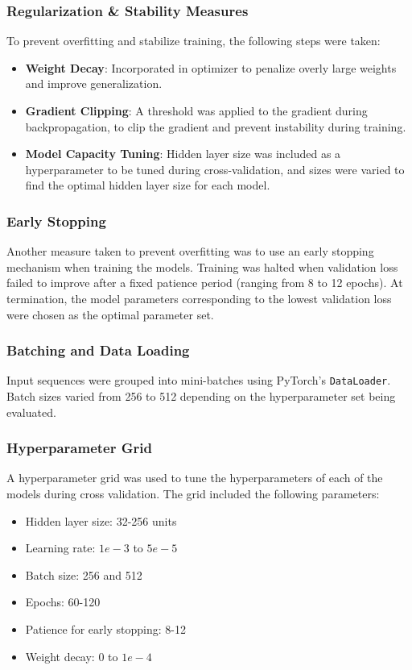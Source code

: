 \documentclass[conference]{IEEEtran}
\begin{document}
\subsubsection{\textbf{Regularization \& Stability Measures}}
To prevent overfitting and stabilize training, the following steps were taken:
\begin{itemize}
    \item \textbf{Weight Decay}: Incorporated in optimizer to penalize overly large weights and improve generalization.
    \item \textbf{Gradient Clipping}: A threshold was applied to the gradient during backpropagation, to clip the gradient and prevent instability during training.
    \item \textbf{Model Capacity Tuning}: Hidden layer size was included as a hyperparameter to be tuned during cross-validation, and sizes were varied to find the optimal hidden layer size for each model.
\end{itemize}

\subsubsection{\textbf{Early Stopping}}
Another measure taken to prevent overfitting was to use an early stopping mechanism when training the models. Training was halted when validation loss failed to improve after a fixed patience period (ranging from 8 to 12 epochs). At termination, the model parameters corresponding to the lowest validation loss were chosen as the optimal parameter set.

\subsubsection{\textbf{Batching and Data Loading}}
Input sequences were grouped into mini-batches using PyTorch's \texttt{DataLoader}. Batch sizes varied from 256 to 512 depending on the hyperparameter set being evaluated.

\subsubsection{\textbf{Hyperparameter Grid}}
A hyperparameter grid was used to tune the hyperparameters of each of the models during cross validation. The grid included the following parameters:
\begin{itemize}
    \item Hidden layer size: 32-256 units
    \item Learning rate: $1e-3$ to $5e-5$
    \item Batch size: 256 and 512
    \item Epochs: 60-120
    \item Patience for early stopping: 8-12
    \item Weight decay: $0$ to $1e-4$
\end{itemize}
\end{document}
